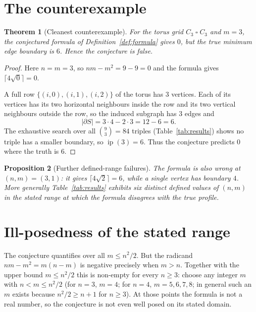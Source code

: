 \documentclass[11pt]{article}
\newtheorem{theorem}{Theorem}
\newtheorem{proposition}[theorem]{Proposition}
\theoremstyle{definition}
\begin{document}
\section{The counterexample}

\begin{theorem}[Cleanest counterexample]\label{thm:main}
For the torus grid $C_3\mathbin{\square} C_3$ and $m=3$, the conjectured formula
of Definition~\ref{def:formula} gives $0$, but the true minimum edge boundary is
$6$. Hence the conjecture is false.
\end{theorem}

\begin{proof}
Here $n=m=3$, so $nm-m^2=9-9=0$ and the formula gives
$\lceil 4\sqrt{0}\rceil=0$.

A full row $\{(i,0),(i,1),(i,2)\}$ of the torus has $3$ vertices. Each of its
vertices has its two horizontal neighbours inside the row and its two vertical
neighbours outside the row, so the induced subgraph has $3$ edges and
\[
  |\partial S| = 3\cdot 4 - 2\cdot 3 = 12-6 = 6 .
\]
The exhaustive search over all $\binom{9}{3}=84$ triples (Table~\ref{tab:results})
shows no triple has a smaller boundary, so $\operatorname{ip}(3)=6$. Thus the
conjecture predicts $0$ where the truth is $6$.
\end{proof}

\begin{proposition}[Further defined-range failures]
The formula is also wrong at $(n,m)=(3,1)$: it gives
$\lceil 4\sqrt{2}\rceil=6$, while a single vertex has boundary $4$. More
generally Table~\ref{tab:results} exhibits six distinct defined values of
$(n,m)$ in the stated range at which the formula disagrees with the true
profile.
\end{proposition}

\section{Ill-posedness of the stated range}

The conjecture quantifies over all $m\le n^2/2$. But the radicand $nm-m^2
= m(n-m)$ is negative precisely when $m>n$. Together with the upper bound
$m\le n^2/2$ this is non-empty for every $n\ge 3$: choose any integer $m$ with
$n<m\le n^2/2$ (for $n=3$, $m=4$; for $n=4$, $m=5,6,7,8$; in general such an
$m$ exists because $n^2/2\ge n+1$ for $n\ge 3$). At those points the formula is
not a real number, so the conjecture is not even well posed on its stated
domain.
\end{document}
